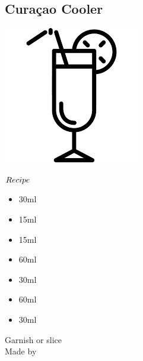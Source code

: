 \subsection{Cura\c{c}ao Cooler}
\vspace{-7.4mm}
\hspace{46mm}
\includegraphics[scale=.07]{cocktail_glass_tall.png}
\vspace{2.5mm}
\begin{itembox}[l]{\boldmath $Recipe$}
\begin{itemize}
\setlength{\parskip}{0cm}
\setlength{\itemsep}{0cm}
\item \wc 30ml
\item \vodka 15ml
\item \bc 15ml
\item \lj 60ml
\item \limj 30ml
\item \oj 60ml
\item \gumsyrup 30ml
\end{itemize}
\vspace{-4mm}
Garnish \cherry or \lime slice\\
Made by \build
\end{itembox}
